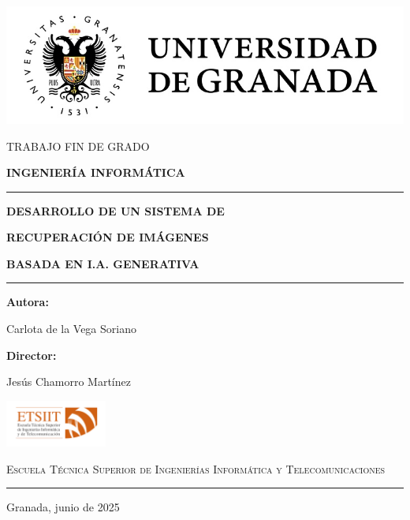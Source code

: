 \documentclass{article}
\begin{document}
    \begin{titlepage}
    \centering
    {\includegraphics[width=1\textwidth]{portada/UGR}\par}
    \vspace{1cm}
    {\scshape\Large TRABAJO FIN DE GRADO \par}
    \vspace{0.5cm}
    {\bfseries INGENIERÍA INFORMÁTICA \par}
    \vspace{1.5cm}
    \rule{15cm}{0.1mm}\par
    \vspace{0.3cm}
    {\bfseries\Large DESARROLLO DE UN SISTEMA DE \par}
    {\bfseries\Large RECUPERACIÓN DE IMÁGENES \par}
    {\bfseries\Large BASADA EN I.A. GENERATIVA \par}
    \vspace{0.3cm}
    \rule{15cm}{0.1mm}\par
    \vspace{1.5cm}
    {\large \textbf{Autora:} \par}
    {\large Carlota de la Vega Soriano \par}
    \vspace{0.3cm}
    {\large \textbf{Director:} \par}
    {\large Jesús Chamorro Martínez \par}
    \vspace{2cm}
    {\includegraphics[width=0.25\textwidth]{portada/etsiit-logo}\par}
    {\scshape\large Escuela Técnica Superior de Ingenierías Informática y Telecomunicaciones \par}
    \vspace{0.3cm}
    \rule{1cm}{0.1mm}\par
    \vspace{0.3cm}
    {Granada, junio de 2025 \par}
\end{titlepage}
\end{document}
